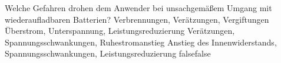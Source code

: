     {Welche Gefahren drohen dem Anwender bei unsachgemäßem Umgang mit wiederaufladbaren Batterien?}
    {Verbrennungen, Verätzungen, Vergiftungen}
    {Überstrom, Unterspannung, Leistungsreduzierung}
    {Verätzungen, Spannungsschwankungen, Ruhestromanstieg}
    {Anstieg des Innenwiderstands, Spannungsschwankungen, Leistungsreduzierung}
    {false}{false}